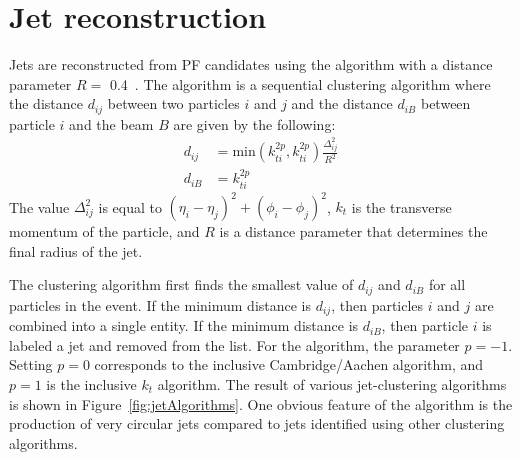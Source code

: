 


\section{Jet reconstruction}
\label{sec:Jet}
Jets are reconstructed from PF candidates using the \antikt algorithm with a distance parameter $R =$ 0.4~\cite{antikt}.  The \antikt algorithm is a sequential clustering algorithm where the distance $d_{ij}$ between two particles $i$ and $j$ and the distance $d_{iB}$ between particle $i$ and the beam $B$ are given by the following: 
\begin{equation}
\begin{aligned}
d_{ij} &= \mathrm{min}(k_{ti}^{2p},k_{ti}^{2p})\frac{\Delta^2_{ij}}{R^2} \\
d_{iB} &= k_{ti}^{2p}
\end{aligned}
\end{equation}
The value $\Delta^2_{ij}$ is equal to $(\eta_i - \eta_j)^2 + (\phi_i - \phi_j)^2$, $k_t$ is the transverse momentum of the particle, and $R$ is a distance parameter that determines the final radius of the jet.

The clustering algorithm first finds the smallest value of $d_{ij}$ and $d_{iB}$ for all particles in the event. If the minimum distance is $d_{ij}$, then particles $i$ and $j$ are combined into a single entity. If the minimum distance is $d_{iB}$, then particle $i$ is labeled a jet and removed from the list. For the \antikt algorithm, the parameter $p = -1$. Setting $p=0$ corresponds to the inclusive Cambridge/Aachen algorithm, and $p=1$ is the inclusive $k_t$ algorithm. The result of various jet-clustering algorithms is shown in Figure~\ref{fig:jetAlgorithms}. One obvious feature of the \antikt algorithm is the production of very circular jets compared to jets identified using other clustering algorithms.
 
